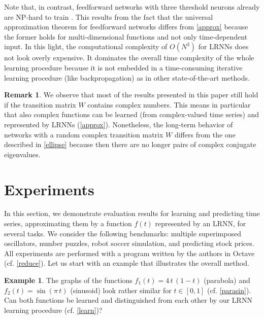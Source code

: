 \documentclass[twoside,11pt]{article}
\theoremstyle{definition}
\newtheorem{exmp}{Example}
\newtheorem{remk}{Remark}
\begin{document}
Note that, in contrast, feedforward networks with three threshold neurons
already are NP-hard to train \citep{BR92}. This results from the fact
that the universal approximation theorem for feedforward networks differs from
\cref{approx} because the former holds for multi-dimensional functions and
not only time-dependent input. In this light, the computational complexity of
$O(N^3)$ for LRNNs does not look overly expensive. It dominates the
overall time complexity of the whole learning procedure because it is not
embedded in a time-consuming iterative learning procedure (like backpropagation)
as in other state-of-the-art methods.

\begin{remk}
We observe that most of the results presented in this paper still
hold if the transition matrix $W$ contains complex numbers. This means in
particular that also complex functions can be learned (from complex-valued time
series) and represented by LRNNs (\cref{approx}).
Nonetheless, the long-term behavior of networks with a random complex transition
matrix $W$ differs from the one described in \cref{ellipse} because then
there are no longer pairs of complex conjugate eigenvalues.
\end{remk}

\section{Experiments}\label{result}

In this section, we demonstrate evaluation results for learning and predicting
time series, approximating them by a function $f(t)$ represented by an LRNN,
for several tasks. We consider the following benchmarks: multiple superimposed
oscillators, number puzzles, robot soccer simulation, and predicting stock
prices. All experiments are performed with a program written by the authors in
Octave \citep{EB+17} (cf. \cref{reduce}). Let us start with an example that
illustrates the overall method.

\begin{exmp}\label{quest}
The graphs of the functions $f_1(t) = 4\,t\,(1-t)$ (parabola) and $f_2(t) =
\sin(\pi\,t)$ (sinusoid) look rather similar for $t \in [0,1]$ (cf.
\cref{parasin}). Can both functions be learned and distinguished from each other
by our LRNN learning procedure (cf. \cref{learn})?
\end{exmp}
\end{document}
